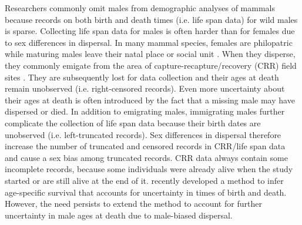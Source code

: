\documentclass[12pt,oneside, a4paper,openright, fleqn, titlepage]{article}
\begin{document}
Researchers commonly omit males from demographic analyses of mammals because records on both birth and death times (i.e. life span data) for wild males is sparse. Collecting life span data for males is often harder than for females due to sex differences in dispersal. In many mammal species, females are philopatric while maturing males leave their natal place or social unit . When they disperse, they commonly emigate from the area of capture-recapture/recovery (CRR) field sites . They are subsequently lost for data collection and their ages at death remain unobserved (i.e. right-censored records). Even more uncertainty about their ages at death is often introduced by the fact that a missing male may have dispersed or died. In addition to emigrating males, immigrating males further complicate the collection of life span data because their birth dates are unobserved (i.e. left-truncated records). Sex differences in dispersal therefore increase the number of truncated and censored records in CRR/life span data and cause a sex bias among truncated records. CRR data always contain some incomplete records, because some individuals were already alive when the study started or are still alive at the end of it. recently developed a method to infer age-specific survival that accounts for uncertainty in times of birth and death. However, the need persists to extend the method to account for further uncertainty in male ages at death due to male-biased dispersal.
\end{document}
